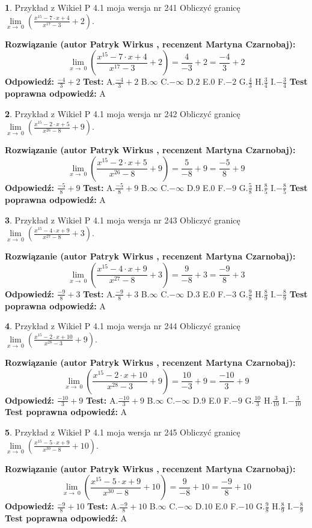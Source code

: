 \documentclass[12pt, a4paper]{article}
\theoremstyle{definition} %
\newtheorem{zad}{}
\newcommand{\zadStart}[1]{\begin{zad}#1\newline}
\newcommand{\zadStop}{\end{zad}}
\newcommand{\rozwStart}[2]{\noindent \textbf{Rozwiązanie (autor #1 , recenzent #2): }\newline}
\newcommand{\rozwStop}{\newline}
\newcommand{\odpStart}{\noindent \textbf{Odpowiedź:}\newline}
\newcommand{\odpStop}{\newline}
\newcommand{\testStart}{\noindent \textbf{Test:}\newline}
\newcommand{\testStop}{\newline}
\newcommand{\kluczStart}{\noindent \textbf{Test poprawna odpowiedź:}\newline}
\newcommand{\kluczStop}{\newline}
\begin{document}
\zadStart{Przykład z Wikieł P 4.1 moja wersja nr 241}
Obliczyć granicę $\lim\limits_{x\to\ 0}(\frac{x^{15}-7 \cdot x +4}{x^{17}-3}+2)$.
\zadStop
\rozwStart{Patryk Wirkus}{Martyna Czarnobaj}
$$\lim\limits_{x\to\ 0}(\frac{x^{15}-7 \cdot x +4}{x^{17}-3}+2)=\frac{4}{-3}+2=\frac{-4}{3}+2$$
\rozwStop
\odpStart
$\frac{-4}{3}+2$
\odpStop
\testStart
A.$\frac{-4}{3}+2$
B.$\infty$
C.$-\infty$
D.$2$
E.$0$
F.$-2$
G.$\frac{4}{3}$
H.$\frac{3}{4}$
I.$-\frac{3}{4}$
\testStop
\kluczStart
A
\kluczStop



\zadStart{Przykład z Wikieł P 4.1 moja wersja nr 242}
Obliczyć granicę $\lim\limits_{x\to\ 0}(\frac{x^{15}-2 \cdot x +5}{x^{26}-8}+9)$.
\zadStop
\rozwStart{Patryk Wirkus}{Martyna Czarnobaj}
$$\lim\limits_{x\to\ 0}(\frac{x^{15}-2 \cdot x +5}{x^{26}-8}+9)=\frac{5}{-8}+9=\frac{-5}{8}+9$$
\rozwStop
\odpStart
$\frac{-5}{8}+9$
\odpStop
\testStart
A.$\frac{-5}{8}+9$
B.$\infty$
C.$-\infty$
D.$9$
E.$0$
F.$-9$
G.$\frac{5}{8}$
H.$\frac{8}{5}$
I.$-\frac{8}{5}$
\testStop
\kluczStart
A
\kluczStop



\zadStart{Przykład z Wikieł P 4.1 moja wersja nr 243}
Obliczyć granicę $\lim\limits_{x\to\ 0}(\frac{x^{15}-4 \cdot x +9}{x^{27}-8}+3)$.
\zadStop
\rozwStart{Patryk Wirkus}{Martyna Czarnobaj}
$$\lim\limits_{x\to\ 0}(\frac{x^{15}-4 \cdot x +9}{x^{27}-8}+3)=\frac{9}{-8}+3=\frac{-9}{8}+3$$
\rozwStop
\odpStart
$\frac{-9}{8}+3$
\odpStop
\testStart
A.$\frac{-9}{8}+3$
B.$\infty$
C.$-\infty$
D.$3$
E.$0$
F.$-3$
G.$\frac{9}{8}$
H.$\frac{8}{9}$
I.$-\frac{8}{9}$
\testStop
\kluczStart
A
\kluczStop



\zadStart{Przykład z Wikieł P 4.1 moja wersja nr 244}
Obliczyć granicę $\lim\limits_{x\to\ 0}(\frac{x^{15}-2 \cdot x +10}{x^{28}-3}+9)$.
\zadStop
\rozwStart{Patryk Wirkus}{Martyna Czarnobaj}
$$\lim\limits_{x\to\ 0}(\frac{x^{15}-2 \cdot x +10}{x^{28}-3}+9)=\frac{10}{-3}+9=\frac{-10}{3}+9$$
\rozwStop
\odpStart
$\frac{-10}{3}+9$
\odpStop
\testStart
A.$\frac{-10}{3}+9$
B.$\infty$
C.$-\infty$
D.$9$
E.$0$
F.$-9$
G.$\frac{10}{3}$
H.$\frac{3}{10}$
I.$-\frac{3}{10}$
\testStop
\kluczStart
A
\kluczStop



\zadStart{Przykład z Wikieł P 4.1 moja wersja nr 245}
Obliczyć granicę $\lim\limits_{x\to\ 0}(\frac{x^{15}-5 \cdot x +9}{x^{30}-8}+10)$.
\zadStop
\rozwStart{Patryk Wirkus}{Martyna Czarnobaj}
$$\lim\limits_{x\to\ 0}(\frac{x^{15}-5 \cdot x +9}{x^{30}-8}+10)=\frac{9}{-8}+10=\frac{-9}{8}+10$$
\rozwStop
\odpStart
$\frac{-9}{8}+10$
\odpStop
\testStart
A.$\frac{-9}{8}+10$
B.$\infty$
C.$-\infty$
D.$10$
E.$0$
F.$-10$
G.$\frac{9}{8}$
H.$\frac{8}{9}$
I.$-\frac{8}{9}$
\testStop
\kluczStart
A
\kluczStop
\end{document}
